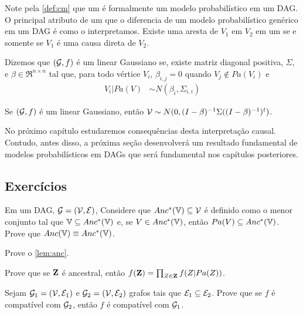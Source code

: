 Note pela \cref{def:cm} que
um \CM é formalmente um modelo probabilístico em um DAG.
O principal atributo de um \CM que 
o diferencia de um modelo probabilístico genérico em um DAG é
como o interpretamos.
Existe uma aresta de $V_1$ em $V_2$ em um \CM
se e somente se $V_1$ é uma causa direta de $V_2$.

\begin{definition}
 Dizemos que $({\mathcal G},f)$ é um \CM linear Gaussiano se,
 existe matriz diagonal positiva, $\Sigma$, e
 $\beta \in \Re^{n \times n}$ tal que,
 para todo vértice $V_i$,
 $\beta_{i,j} = 0$ quando $V_j \notin Pa(V_i)$ e
 \begin{align*}
  V_i|Pa(V) &\sim N(\beta_i, \Sigma_{i,i})
 \end{align*}
\end{definition}

\begin{lemma}
 Se $({\mathcal G},f)$ é um \CM linear Gaussiano, então
 ${\mathcal V} \sim N(0, (I-\beta)^{-1}\Sigma((I-\beta)^{-1})^t)$.
\end{lemma}

No próximo capítulo estudaremos consequências desta interpretação causal.
Contudo, antes disso, a próxima seção desenvolverá
um resultado fundamental de modelos probabilísticos em DAGs que
será fundamental nos capítulos posteriores.

\subsection{Exercícios}

\begin{exercise}
 Em um DAG, ${\mathcal G} = ({\mathcal V}, {\mathcal E})$,
 Considere que $Anc^*({\mathbb V}) \subseteq {\mathcal V}$ é
 definido como o menor conjunto tal que
 ${\mathbb V} \subseteq Anc^*({\mathbb V})$ e,
 se $V \in Anc^*({\mathbb V})$, então
 $Pa(V) \subseteq Anc^*({\mathbb V})$.
 Prove que $Anc({\mathbb V}) \equiv Anc^*({\mathbb V})$.
\end{exercise}

\begin{exercise} 
 Prove o \cref{lem:anc}.
\end{exercise}

\begin{exercise}
 \label{lemma:anc_fact}
 Prove que se ${\mathbf{Z}}$ é ancestral, então
 $f({\mathbf{Z}}) = \prod_{Z \in {\mathbf{Z}}}f(Z|Pa(Z))$. 
\end{exercise}

\begin{exercise}
 Sejam ${\mathcal G}_1 = ({\mathcal V}, {\mathcal E}_1)$ e
 ${\mathcal G}_2 = ({\mathcal V}, {\mathcal E}_2)$ grafos
 tais que ${\mathcal E}_1 \subseteq {\mathcal E}_2$.
 Prove que se 
 $f$ é compatível com ${\mathcal G}_2$, então 
 $f$ é compatível com ${\mathcal G}_1$.
\end{exercise}


